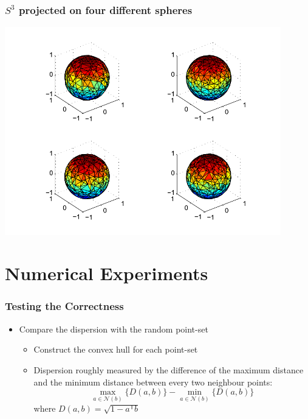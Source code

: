 \documentclass[serif]{beamer} %
\begin{document}
\begin{frame}
  \frametitle{$S^3$ projected on four different spheres}
  \centerline{\includegraphics[width=0.9\textwidth]{res_proj.pdf}}
\end{frame}



\section{Numerical Experiments}

\begin{frame}
  \frametitle{Testing the Correctness}
  \begin{itemize}
    \item Compare the dispersion with the random point-set
    \begin{itemize}
      \item Construct the convex hull for each point-set
      \item Dispersion roughly measured by the difference of the maximum distance and the minimum distance between every two neighbour points:
\[
      \max_{a \in \mathcal{N}(b)} \{D(a,b)\} -
        \min_{a \in \mathcal{N}(b)} \{ D(a, b) \}
\]
      where $D(a,b) = \sqrt{1 - a^\mathsf{T} b}$
    \end{itemize}
  \end{itemize}
\end{frame}
\end{document}
